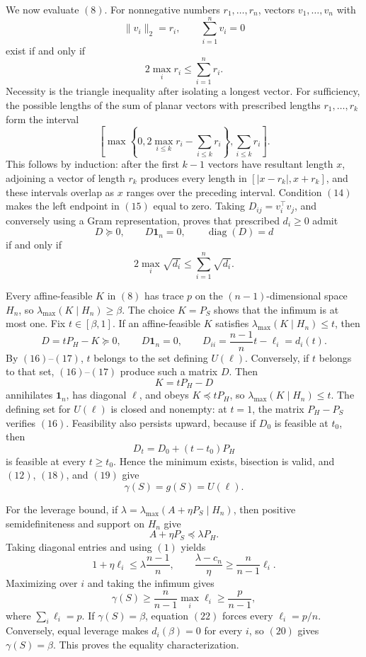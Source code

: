 We now evaluate \((8)\).  For nonnegative numbers \(r_1,\ldots,r_n\), vectors \(v_1,\ldots,v_n\) with
\[
\|v_i\|_2=r_i,
\qquad
\sum_{i=1}^n v_i=0
\tag{13}
\]
exist if and only if
\[
2\max_i r_i\leq\sum_{i=1}^n r_i.
\tag{14}
\]
Necessity is the triangle inequality after isolating a longest vector.  For sufficiency, the possible lengths of the sum of planar vectors with prescribed lengths \(r_1,\ldots,r_k\) form the interval
\[
\left[
\max\left\{0,2\max_{i\leq k}r_i-\sum_{i\leq k}r_i\right\},
\sum_{i\leq k}r_i
\right].
\tag{15}
\]
This follows by induction: after the first \(k-1\) vectors have resultant length \(x\), adjoining a vector of length \(r_k\) produces every length in \([|x-r_k|,x+r_k]\), and these intervals overlap as \(x\) ranges over the preceding interval.  Condition \((14)\) makes the left endpoint in \((15)\) equal to zero.  Taking \(D_{ij}=v_i^\top v_j\), and conversely using a Gram representation, proves that prescribed \(d_i\geq0\) admit
\[
D\succeq0,
\qquad
D\mathbf1_n=0,
\qquad
\operatorname{diag}(D)=d
\tag{16}
\]
if and only if
\[
2\max_i\sqrt{d_i}\leq\sum_{i=1}^n\sqrt{d_i}.
\tag{17}
\]

Every affine-feasible \(K\) in \((8)\) has trace \(p\) on the \((n-1)\)-dimensional space \(H_n\), so \(\lambda_{\max}(K\mid H_n)\geq\beta\).  The choice \(K=P_S\) shows that the infimum is at most one.  Fix \(t\in[\beta,1]\).  If an affine-feasible \(K\) satisfies \(\lambda_{\max}(K\mid H_n)\leq t\), then
\[
D=tP_H-K\succeq0,
\qquad
D\mathbf1_n=0,
\qquad
D_{ii}=\frac{n-1}{n}t-\ell_i=d_i(t).
\tag{18}
\]
By \((16)\)--\((17)\), \(t\) belongs to the set defining \(U(\ell)\).  Conversely, if \(t\) belongs to that set, \((16)\)--\((17)\) produce such a matrix \(D\).  Then
\[
K=tP_H-D
\tag{19}
\]
annihilates \(\mathbf1_n\), has diagonal \(\ell\), and obeys \(K\preceq tP_H\), so \(\lambda_{\max}(K\mid H_n)\leq t\).  The defining set for \(U(\ell)\) is closed and nonempty: at \(t=1\), the matrix \(P_H-P_S\) verifies \((16)\).  Feasibility also persists upward, because if \(D_0\) is feasible at \(t_0\), then
\[
D_t=D_0+(t-t_0)P_H
\]
is feasible at every \(t\geq t_0\).  Hence the minimum exists, bisection is valid, and \((12)\), \((18)\), and \((19)\) give
\[
\gamma(S)=g(S)=U(\ell).
\tag{20}
\]

For the leverage bound, if \(\lambda=\lambda_{\max}(A+\eta P_S\mid H_n)\), then positive semidefiniteness and support on \(H_n\) give
\[
A+\eta P_S\preceq\lambda P_H.
\]
Taking diagonal entries and using \((1)\) yields
\[
1+\eta\ell_i\leq\lambda\frac{n-1}{n},
\qquad
\frac{\lambda-c_n}{\eta}\geq\frac{n}{n-1}\ell_i.
\tag{21}
\]
Maximizing over \(i\) and taking the infimum gives
\[
\gamma(S)\geq\frac{n}{n-1}\max_i\ell_i
\geq\frac{p}{n-1},
\tag{22}
\]
where \(\sum_i\ell_i=p\).  If \(\gamma(S)=\beta\), equation \((22)\) forces every \(\ell_i=p/n\).  Conversely, equal leverage makes \(d_i(\beta)=0\) for every \(i\), so \((20)\) gives \(\gamma(S)=\beta\).  This proves the equality characterization.

